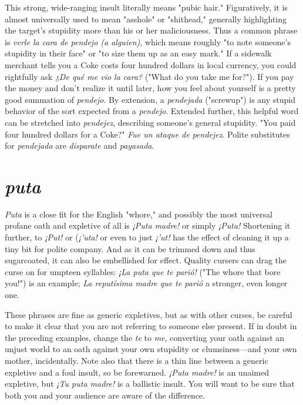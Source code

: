 This strong, wide-ranging insult literally means "pubic hair."
Figuratively, it is almost universally used to mean "asshole" or "shithead," generally highlighting the target's stupidity more than his or
her maliciousness. Thus a common phrase is \emph{verle la cara de pendejo
(a alguien)}, which means roughly "to note someone's stupidity in their
face" or "to size them up as an easy mark." If a sidewalk merchant
tells you a Coke costs four hundred dollars in local currency, you could
rightfully ask \emph{¿De qué me vio la cara?} ("What do you take me for?"). If
you pay the money and don't realize it until later, how you feel about
yourself is a pretty good summation of \emph{pendejo}. By extension, a \emph{pendejada} ("screwup") is any stupid behavior of the sort expected from a
\emph{pendejo}. Extended further, this helpful word can be stretched into \emph{pendejez}, describing someone's general stupidity. "You paid four hundred
dollars for a Coke?" \emph{Fue un ataque de pendejez}. Polite substitutes for
\emph{pendejada} are \emph{disparate} and \emph{payasada}.

\section{\emph{puta}}

\emph{Puta} is a close fit for the English "whore," and possibly the
most universal profane oath and expletive of all is \emph{¡Puta madre!} or
simply \emph{¡Puta!} Shortening it further, to \emph{¡Put!} or (\emph{¡'uta!} or even to just
\emph{¡'ut!} has the effect of cleaning it up a tiny bit for polite company. And
as it can be trimmed down and thus sugarcoated, it can also be embellished for effect. Quality cursers can drag the curse on for umpteen syllables: \emph{¡La puta que te parió!} ("The whore that bore you!") is an example; \emph{La reputísima madre que te parió} a stronger, even longer one.

These phrases are fine as generic expletives, but as with other
curses, be careful to make it clear that you are not referring to someone else present. If in doubt in the preceding examples, change the \emph{te}
to \emph{me}, converting your oath against an unjust world to an oath against
your own stupidity or clumsiness---and your own mother, incidentally.
Note also that there is a thin line between a generic expletive and a
foul insult, so be forewarned. \emph{¡Puta madre!} is an unaimed expletive,
but \emph{¡Tu puta madre!} is a ballistic insult. You will want to be sure that
both you and your audience are aware of the difference.

